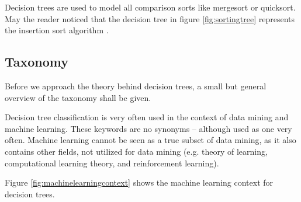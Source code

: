 \begin{remark}
    Decision trees are used to model all comparison sorts like mergesort or quicksort. May the reader noticed that the decision tree in figure \ref{fig:sortingtree} represents the insertion sort algorithm \cite[p. 208]{cormen2001introduction}. 
\end{remark}




\subsection{Taxonomy}\label{taxonomy}

Before we approach the theory behind decision trees, a small but general overview of the taxonomy shall be given.

Decision tree classification is very often used in the context of data mining and machine learning. These keywords are no synonyms -- although used as one very often. Machine learning cannot be seen as a true subset of data mining, as it also contains other fields, not utilized for data mining (e.g. theory of learning, computational learning theory, and reinforcement learning).

Figure \ref{fig:machinelearningcontext} shows the machine learning context for decision trees. 

